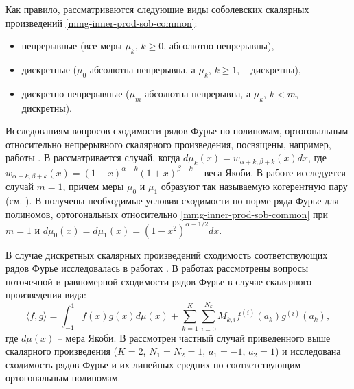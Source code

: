 Как правило, рассматриваются следующие виды соболевских скалярных произведений \eqref{mmg-inner-prod-sob-common}:
\begin{itemize}
	\item
	непрерывные (все меры $\mu_k$, $k \ge 0$, абсолютно непрерывны),
	\item
	дискретные ($\mu_0$ абсолютна непрерывна, а $\mu_k$, $k \ge 1$, -- дискретны),
	\item
	дискретно-непрерывные ($\mu_m$ абсолютна непрерывна, а $\mu_k$, $k < m$, -- дискретны).	
\end{itemize}

Исследованиям вопросов сходимости рядов Фурье по полиномам, ортогональным относительно непрерывного скалярного произведения, посвящены, например, работы \cite{mmg-MarcellanJacobiSobolev,mmg-CiaurriJacobiSobolev,mmg-CiaurriCoherentPairs,mmg-Fejzullahu2010,mmg-Fejzullahu2013}. В \cite{mmg-MarcellanJacobiSobolev,mmg-CiaurriJacobiSobolev} рассматривается случай, когда $d\mu_k(x)=w_{\alpha+k,\beta+k}(x)dx$, где $w_{\alpha+k,\beta+k}(x)=(1-x)^{\alpha+k}(1+x)^{\beta+k}$ -- веса Якоби. В работе \cite{mmg-CiaurriCoherentPairs} исследуется случай $m=1$, причем меры $\mu_0$ и $\mu_1$ образуют так называемую когерентную пару (см. \cite{mmg-IserlesKoch1991,mmg-MarcellanXu2015}). В \cite{mmg-Fejzullahu2010} получены необходимые условия сходимости по норме ряда Фурье для полиномов, ортогональных относительно \eqref{mmg-inner-prod-sob-common} при $m=1$ и $d\mu_0(x)=d\mu_1(x)=(1-x^2)^{\alpha-1/2}dx$.

В случае дискретных скалярных произведений сходимость соответствующих рядов Фурье исследовалась в работах \cite{mmg-Marcellan2002,mmg-Rocha2003,mmg-OsilenkerFourier2012,mmg-OsilenkerLinearMethods2015,mmg-Fejzullahu2009,mmg-CiaurriSigma2018}. В работах \cite{mmg-Marcellan2002,mmg-Rocha2003} рассмотрены вопросы поточечной и равномерной сходимости рядов Фурье в случае скалярного произведения вида:
\begin{equation*}
	\langle f,g \rangle = \int_{-1}^{1}f(x)g(x)d\mu(x)+
	\sum_{k=1}^K\sum_{i=0}^{N_k} M_{k,i}f^{(i)}(a_k)g^{(i)}(a_k),
\end{equation*}
где $d\mu(x)$ -- мера Якоби. В \cite{mmg-OsilenkerFourier2012,mmg-OsilenkerLinearMethods2015,mmg-Fejzullahu2009,mmg-CiaurriSigma2018} рассмотрен частный случай приведенного выше скалярного произведения ($K=2$, $N_1=N_2=1$, $a_1=-1$, $a_2=1$) и исследована сходимость рядов Фурье и их линейных средних по соответствующим ортогональным полиномам.

